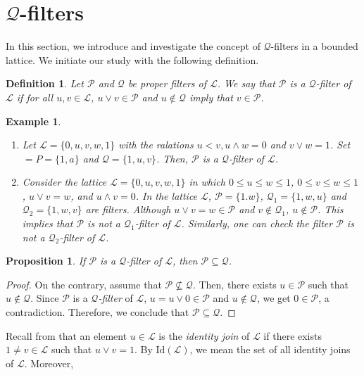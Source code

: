 \documentclass[10pt,a4paper]{amsart}
\newtheorem{definition}[theorem]{Definition}
\newtheorem{example}[theorem]{Example}
\newtheorem{proposition}[theorem]{Proposition}
\numberwithin{equation}{section}
\begin{document}
\section{$\mathcal{Q}$-filters}
In this section, we introduce and investigate the  concept of $\mathcal{Q}$-filters in a bounded lattice. We initiate our study with the following definition.
\begin{definition}
Let $\mathcal{P}$ and $ \mathcal{Q}$ be  proper filters of $\mathcal{L}$. We say that $\mathcal{P}$ is a {\it $\mathcal{Q}$-filter} of $\mathcal{L}$  if  for all $u,v \in \mathcal{L}$,   $u \vee v \in \mathcal{P}$ and $u \notin \mathcal{Q}$ imply that   $v \in \mathcal{P}$.
\end{definition}
\begin{example} \label{exa1}
\begin{enumerate}
\item Let $\mathcal{L}=\{0,u,v,w,1\}$ with the ralations $u < v, u \wedge w=0$ and $v \vee w=1$. Set $\mathcal={P}=\{1,a\}$ and $\mathcal{Q}=\{1,u,v\}$. Then, $\mathcal{P}$ is a $\mathcal{Q}$-filter of $\mathcal{L}$.
\item Consider the lattice $\mathcal{L} = \{0, u, v, w, 1\}$   in which  $0 \le u \le w \le 1$, $0 \le v \le w \le 1$, $u \vee v = w$, and $u \wedge v = 0$. In the lattice $\mathcal{L}$, $\mathcal{P}=\{1.w\}$, $\mathcal{Q}_1=\{1,w,u\}$ and $\mathcal{Q}_2=\{1,w,v\}$ are filters.   Although  $u \vee v =w\in \mathcal{P}$ and $v \notin \mathcal{Q}_1$, $u \notin  \mathcal{P}$. This implies that $\mathcal{P}$ is not a $\mathcal{Q}_1$-filter of $\mathcal{L}$. Similarly, one  can  check the filter $\mathcal{P}$  is  not a  $\mathcal{Q}_2$-filter  of $\mathcal{L}$.
 \end{enumerate}
\end{example}
\begin{proposition}
If $\mathcal{P}$ is a {\it $\mathcal{Q}$-filter} of $\mathcal{L}$, then $\mathcal{P} \subseteq  \mathcal{Q}$. 
\end{proposition}
\begin{proof}
On the contrary, assume that $\mathcal{P} \nsubseteq  \mathcal{Q}$. Then, there exists $u \in \mathcal{P}$ such that  $u \notin  \mathcal{Q}$. Since $\mathcal{P}$ is a {\it $\mathcal{Q}$-filter} of $\mathcal{L}$, $u =u \vee 0 \in \mathcal{P}$ and $u \notin  \mathcal{Q}$, we get $0 \in \mathcal{P}$, a contradiction. Therefore, we conclude that $\mathcal{P} \subseteq  \mathcal{Q}$. 
\end{proof}
Recall from \cite{Atani2} that an element $u \in \mathcal{L}$ is  the {\it identity join} of $\mathcal{L}$ if there exists $1 \neq v \in \mathcal{L}$ such that $u \vee v =1$. By $\text{Id}(\mathcal{L})$, we mean the set of all identity joins of $\mathcal{L}$. Moreover, 
\end{document}
